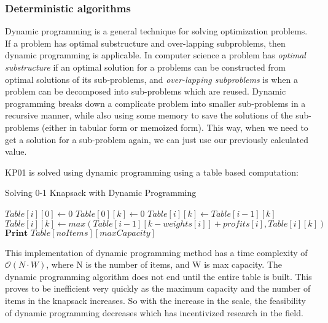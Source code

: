 \documentclass[titlepage]{article}
\begin{document}
\subsubsection*{Deterministic algorithms}
Dynamic programming is a general technique for solving optimization problems. If a problem has optimal substructure and over-lapping subproblems, then dynamic programming is applicable. In computer science 
a problem has \emph{optimal substructure} if an optimal solution for a problems can be constructed from optimal solutions of its sub-problems, and \emph{over-lapping subproblems} is when a problem can be decomposed into sub-problems which are reused. Dynamic programming breaks down a complicate problem into smaller sub-problems in a recursive manner, while also using some memory to save the solutions of the sub-problems (either in tabular form or memoized form). This way, when we need to get a solution for a sub-problem again, we can just use our previously calculated value. 

KP01 is solved using dynamic programming using a table based computation:

\begin{breakablealgorithm}
\caption{Solving 0-1 Knapsack with Dynamic Programming}\label{dp}
    \begin{algorithmic}[1]
         \Comment{\textcolor{blue}{If no items, then profit = 0}}
            \State $Table[i][0] \gets 0 $ 
        \EndFor
         \Comment{\textcolor{blue}{If no capacity, then profit = 0}}
            \State $Table[0][k] \gets 0 $
        \EndFor
                \State $Table[i][k] \gets Table[i-1][k]$  
                    \State $Table[i][k] \gets max(Table[i-1][k-weights[i]] + profits[i], Table[i][k]) $
                \EndIf
            \EndFor
        \EndFor
        \State $\textbf{Print } Table[noItems][maxCapacity] $
    \end{algorithmic}
\end{breakablealgorithm}

This implementation of dynamic programming method has a time complexity of $\mathcal{O}(N\cdot W)$, where N is the number of items, and W is max capacity. The dynamic programming algorithm does not end until the entire table is built. This proves to be inefficient very quickly as the maximum capacity and the number of items in the knapsack increases. So with the increase in the scale, the feasibility of dynamic programming decreases which has incentivized research in the field.
\end{document}
